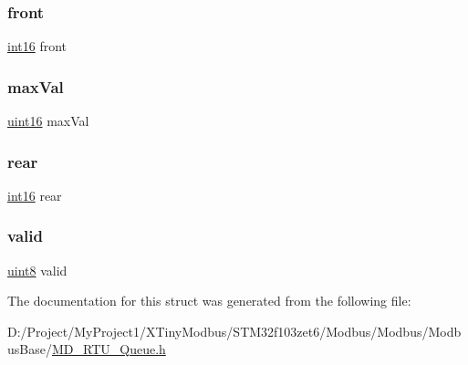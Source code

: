 \mbox{\label{struct_p_m_d_sq_queue_a69c2ccf666e0a3480064e9c162d5f4fb}} 
\subsubsection{\texorpdfstring{front}{front}}
{\footnotesize\ttfamily \mbox{\hyperlink{_m_d___r_t_u___type_8h_a4355d16fcf9f644c9ac84293f0b1801f}{int16}} front}

\mbox{\label{struct_p_m_d_sq_queue_a8b13643a6b1fb0032a6d2b39cf902351}} 
\subsubsection{\texorpdfstring{max\+Val}{maxVal}}
{\footnotesize\ttfamily \mbox{\hyperlink{_m_d___r_t_u___type_8h_a05f6b0ae8f6a6e135b0e290c25fe0e4e}{uint16}} max\+Val}

\mbox{\label{struct_p_m_d_sq_queue_a9a1ba556d87c278a86e2a8dc90eb9fb7}} 
\subsubsection{\texorpdfstring{rear}{rear}}
{\footnotesize\ttfamily \mbox{\hyperlink{_m_d___r_t_u___type_8h_a4355d16fcf9f644c9ac84293f0b1801f}{int16}} rear}

\mbox{\label{struct_p_m_d_sq_queue_afc5dbcc47c15402566b656dca804146f}} 
\subsubsection{\texorpdfstring{valid}{valid}}
{\footnotesize\ttfamily \mbox{\hyperlink{_m_d___r_t_u___type_8h_adde6aaee8457bee49c2a92621fe22b79}{uint8}} valid}



The documentation for this struct was generated from the following file\+:\begin{DoxyCompactItemize}
\item 
D\+:/\+Project/\+My\+Project1/\+X\+Tiny\+Modbus/\+S\+T\+M32f103zet6/\+Modbus/\+Modbus/\+Modbus\+Base/\mbox{\hyperlink{_m_d___r_t_u___queue_8h}{M\+D\+\_\+\+R\+T\+U\+\_\+\+Queue.\+h}}\end{DoxyCompactItemize}
